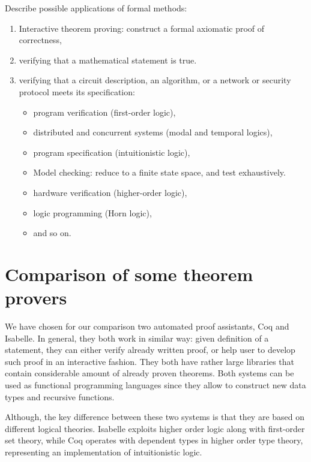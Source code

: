 \documentclass[article]{aaltoseries}
\begin{document}
Describe possible applications of formal methods:
\begin{enumerate}
	\itemsep0em
	\item Interactive theorem proving: construct a formal axiomatic proof of correctness, 
	\item verifying that a mathematical statement is true.
	\item verifying that a circuit description, an algorithm, or a network or security protocol meets its specification:
	\begin{itemize}
		\item program verification (first-order logic), 
		\item distributed and concurrent systems (modal and temporal logics), 
		\item program specification (intuitionistic logic),
		\item Model checking: reduce to a finite state space, and test exhaustively.
		\item hardware verification (higher-order logic), 
		\item logic programming (Horn logic), 
		\item and so on.
	\end{itemize}
\end{enumerate}


\section{Comparison of some theorem provers}
\label{sec:comparison}

We have chosen for our comparison two automated proof assistants, Coq and Isabelle. 
In general, they both work in similar way: given definition of a statement, they can either verify already written proof, or help user to develop such proof in an interactive fashion. They both have rather large libraries that contain considerable amount of already proven theorems. 
Both systems can be used as functional programming languages since they allow to construct new data types and recursive functions.

Although, the key difference between these two systems is that they are based on different logical theories. Isabelle exploits higher order logic along with first-order set theory, while Coq operates with dependent types in higher order type theory, representing an implementation of intuitionistic logic.
\end{document}
